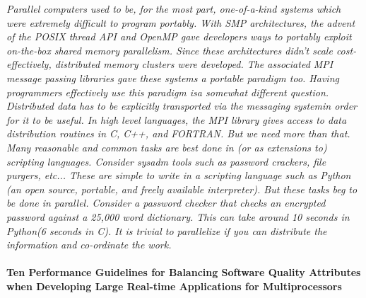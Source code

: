 \documentclass{article}
\begin{document}
\emph{Parallel computers used to be, for the most part, one-of-a-kind systems
which were extremely difficult to program portably. With SMP architectures, the
advent of the POSIX thread API and OpenMP gave developers ways to portably
exploit on-the-box shared memory parallelism. Since these architectures
didn't scale cost-effectively, distributed memory clusters were developed. The
associated MPI message passing libraries gave these systems a portable paradigm
too. Having programmers effectively use this paradigm isa somewhat different
question. Distributed data has to be explicitly transported via the messaging
systemin order for it to be useful. In high level languages, the MPI library
gives access to data distribution routines in C, C++, and FORTRAN. But we need
more than that. Many reasonable and common tasks are best done in (or as
extensions to) scripting languages. Consider sysadm tools such as password
crackers, file purgers, etc... These are simple to write in a scripting
language such as Python (an open source, portable, and freely available
interpreter). But these tasks beg to be done in parallel. Consider a
password checker that checks an encrypted password against a 25,000 word
dictionary. This can take around 10 seconds in Python(6 seconds in C). It is
trivial to parallelize if you can distribute the information and co-ordinate
the work.}

\paragraph{Ten Performance Guidelines for Balancing Software Quality Attributes
when Developing Large Real-time Applications for Multiprocessors}
\cite{haggander1999guidelines}
\end{document}
